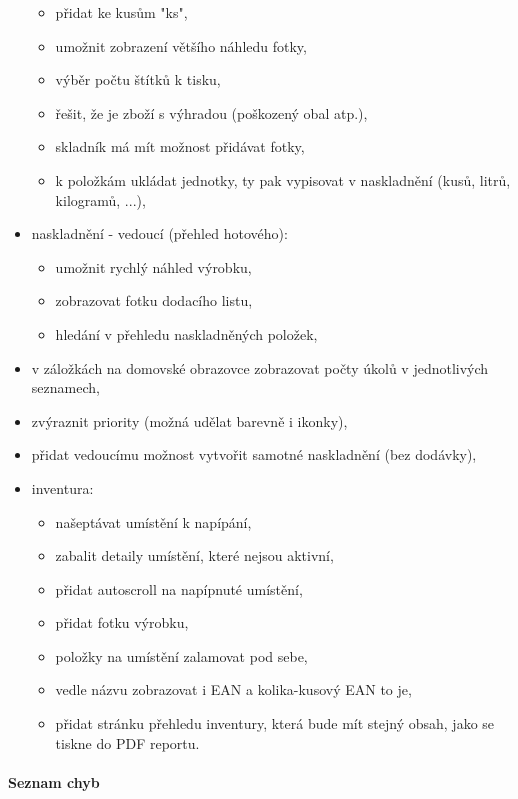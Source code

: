 \begin{itemize}
	\begin{itemize}
		\item přidat ke kusům "ks",
		\item umožnit zobrazení většího náhledu fotky,
		\item výběr počtu štítků k tisku,
		\item řešit, že je zboží s výhradou (poškozený obal atp.),
		\item skladník má mít možnost přidávat fotky,
		\item k položkám ukládat jednotky, ty pak vypisovat v naskladnění (kusů, litrů, kilogramů, ...),
	\end{itemize}
	\item naskladnění - vedoucí (přehled hotového):
	\begin{itemize}
		\item umožnit rychlý náhled výrobku,
		\item zobrazovat fotku dodacího listu,
		\item hledání v přehledu naskladněných položek,
	\end{itemize}
	\item v záložkách na domovské obrazovce zobrazovat počty úkolů v jednotlivých seznamech,
	\item zvýraznit priority (možná udělat barevně i ikonky),
	\item přidat vedoucímu možnost vytvořit samotné naskladnění (bez dodávky),
	\item inventura:
	\begin{itemize}
		\item našeptávat umístění k napípání,
		\item zabalit detaily umístění, které nejsou aktivní,
		\item přidat autoscroll na napípnuté umístění,
		\item přidat fotku výrobku,
		\item položky na umístění zalamovat pod sebe,
		\item vedle názvu zobrazovat i EAN a kolika-kusový EAN to je,
		\item přidat stránku přehledu inventury, která bude mít stejný obsah, jako se tiskne do PDF reportu.
	\end{itemize}
\end{itemize}

\paragraph{Seznam chyb}

